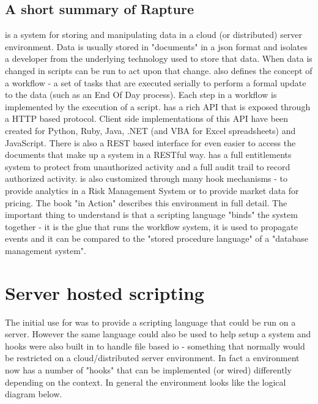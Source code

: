 \section{A short summary of Rapture}
\Rapture is a system for storing and manipulating data in a cloud (or distributed) server environment. Data is usually stored in "documents"  in a json  format and \Rapture isolates a developer from the underlying technology used to store that data. When data is changed in \Rapture scripts can be run to act upon that change. \Rapture also defines the concept of a workflow  - a set of tasks that are executed serially to perform a formal update to the data (such as an End Of Day process). Each step in a workflow is implemented by the execution of a script. \Rapture has a rich API that is exposed through a HTTP based protocol. Client side implementations of this API have been created for Python, Ruby, Java, .NET  (and VBA  for Excel  spreadsheets) and JavaScript. There is also a REST  based interface for even easier to access the documents that make up a \Rapture system in a RESTful way. \Rapture has a full entitlements  system to protect from unauthorized activity and a full audit trail to record authorized activity. \Rapture is also customized through many hook mechanisms - to provide analytics in a Risk Management System or to provide market data for pricing. The book "\Rapture in Action" describes this environment in full detail. The important thing to understand is that a scripting language "binds" the \Rapture system together - it is the glue that runs the workflow system, it is used to propagate events and it can be compared to the "stored procedure language" of a "database management system". 

\chapter{Server hosted scripting}
The initial use for \Reflex was to provide a scripting language that could be run on a server. However the same language could also be used to help setup a \Rapture system and hooks were also built in to handle file based io - something that normally would be restricted on a cloud/distributed server environment. In fact a \Reflex environment now has a number of "hooks" that can be implemented (or wired) differently depending on the context. In general the environment looks like the logical diagram below.

